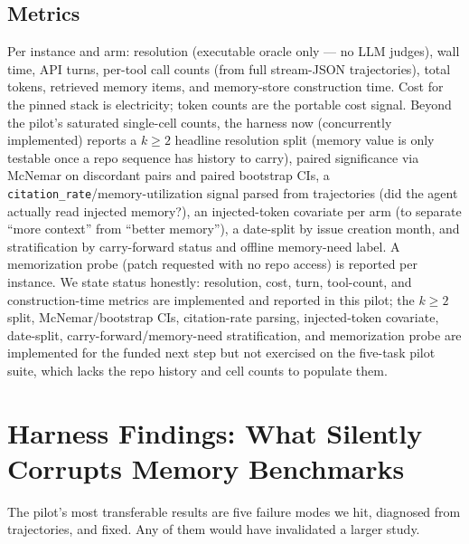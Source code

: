\documentclass[11pt]{article}
\begin{document}
\subsection{Metrics}
Per instance and arm: resolution (executable oracle only --- no LLM judges), wall time, API turns, per-tool call counts (from full stream-JSON trajectories), total tokens, retrieved memory items, and memory-store construction time. Cost for the pinned stack is electricity; token counts are the portable cost signal. Beyond the pilot's saturated single-cell counts, the harness now (concurrently implemented) reports a $k{\geq}2$ headline resolution split (memory value is only testable once a repo sequence has history to carry), paired significance via McNemar on discordant pairs and paired bootstrap CIs, a \texttt{citation\_rate}/memory-utilization signal parsed from trajectories (did the agent actually read injected memory?), an injected-token covariate per arm (to separate ``more context'' from ``better memory''), a date-split by issue creation month, and stratification by carry-forward status and offline memory-need label. A memorization probe (patch requested with no repo access) is reported per instance. We state status honestly: resolution, cost, turn, tool-count, and construction-time metrics are implemented and reported in this pilot; the $k{\geq}2$ split, McNemar/bootstrap CIs, citation-rate parsing, injected-token covariate, date-split, carry-forward/memory-need stratification, and memorization probe are implemented for the funded next step but not exercised on the five-task pilot suite, which lacks the repo history and cell counts to populate them.

\section{Harness Findings: What Silently Corrupts Memory Benchmarks}
\label{sec:harness}

The pilot's most transferable results are five failure modes we hit, diagnosed from trajectories, and fixed. Any of them would have invalidated a larger study.
\end{document}
